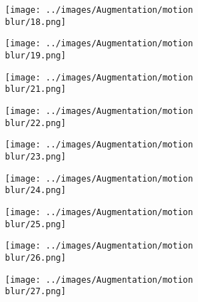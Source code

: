 \begin{figure}[H]
\hspace{1em}%
\begin{subfigure}[b]{0.1\textwidth}
 \centering
 \texttt{[image: ../images/Augmentation/motion blur/18.png]}
\end{subfigure}
\hspace{1em}%
\begin{subfigure}[b]{0.1\textwidth}
 \centering
 \texttt{[image: ../images/Augmentation/motion blur/19.png]}
\end{subfigure}
\hspace{1em}%
\begin{subfigure}[b]{0.1\textwidth}
\centering
\texttt{[image: ../images/Augmentation/motion blur/21.png]}
\end{subfigure}
\hspace{1em}%
\begin{subfigure}[b]{0.1\textwidth}
 \centering
 \texttt{[image: ../images/Augmentation/motion blur/22.png]}
\end{subfigure}
\hspace{1em}%
\begin{subfigure}[b]{0.1\textwidth}
 \centering
 \texttt{[image: ../images/Augmentation/motion blur/23.png]}
\end{subfigure}
\hspace{1em}%
\begin{subfigure}[b]{0.1\textwidth}
 \centering
 \texttt{[image: ../images/Augmentation/motion blur/24.png]}
\end{subfigure}
\hspace{1em}%
\begin{subfigure}[b]{0.1\textwidth}
\centering
\texttt{[image: ../images/Augmentation/motion blur/25.png]}
\end{subfigure}
\hspace{1em}%
\begin{subfigure}[b]{0.1\textwidth}
 \centering
 \texttt{[image: ../images/Augmentation/motion blur/26.png]}
\end{subfigure}
\hspace{1em}%
\begin{subfigure}[b]{0.1\textwidth}
 \centering
 \texttt{[image: ../images/Augmentation/motion blur/27.png]}
\end{subfigure}
\hspace{1em}%
\begin{subfigure}[b]{0.1\textwidth}

\end{subfigure}
\end{figure}
